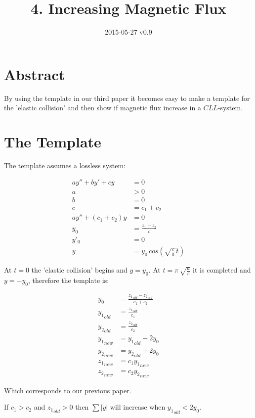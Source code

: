 \documentclass[]{../common/elementary-physics}
\title{4. Increasing Magnetic Flux}
\date{2015-05-27 v0.9}
\begin{document}
\maketitle

\tableofcontents

\section{Abstract}

By using the template in our third paper\cite{ef3ch} it becomes easy to make a template for the 'elastic collision' and then show if magnetic flux increase in a $CLL$-system.

\section{The Template}

The template assumes a lossless system:

\begin{align}
a y'' + b y' + c y &= 0 \\
a &> 0 \\
b &= 0 \\
c &= c_1 + c_2 \\
a y'' + (c_1 + c_2) y &= 0 \\
y_0 &= \frac{z_1-z_2}{c} \\
y'_0 &= 0 \\
y &= y_0 \, cos(\sqrt{\frac{c}{a} \, t})
\end{align}

At $t=0$ the 'elastic collision' begins and $y=y_0$.
At $t = \pi \, \sqrt{\frac{a}{c}}$ it is completed and $y = -y_0$, therefore the template is:

\begin{align}
y_0 &= \frac{{z_1}_{old}-{z_2}_{old}}{c_1 + c_2} \\
{y_1}_{old} &= \frac{{z_1}_{old}}{c_1} \\
{y_2}_{old} &= \frac{{z_2}_{old}}{c_2} \\
{y_1}_{new} &= {y_1}_{old} -2 y_0 \\
{y_2}_{new} &= {y_2}_{old} +2 y_0 \\
{z_1}_{new} &= c_1 {y_1}_{new} \\
{z_2}_{new} &= c_2 {y_2}_{new}
\end{align}

Which corresponds to our previous paper\cite{ef1ch}.

If $c_1 > c_2$ and ${z_1}_{old} > 0$ then $\sum |y|$ will increase when ${y_1}_{old} < 2 y_0$.
\end{document}
